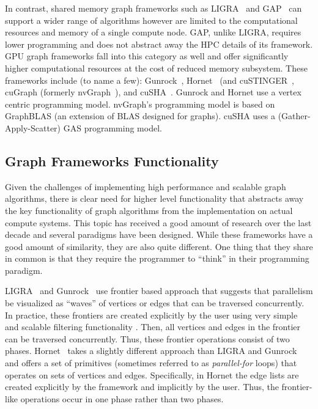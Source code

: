 In contrast, shared memory graph frameworks such as LIGRA~\cite{shun2013ligra} and  GAP~\cite{beamer2015gap} can support a wider range of algorithms however are limited to the computational resources and memory of a single compute node. GAP, unlike LIGRA, requires lower programming and does not abstract away the HPC details of its framework.
GPU graph frameworks fall into this category as well and offer significantly higher computational resources at the cost of reduced memory subsystem.
These frameworks include (to name a few): Gunrock~\cite{wang2017gunrock}, Hornet~\cite{green-hornet} (and cuSTINGER~\cite{DBLP:conf/hpec/GreenB16}, cuGraph (formerly nvGraph~\cite{nvGraph}), and cuSHA~\cite{cusha}.
Gunrock and Hornet use a vertex centric programming model. nvGraph's programming model is based on GraphBLAS (an extension of BLAS designed for graphs). cuSHA uses a (Gather-Apply-Scatter) GAS programming model.

\subsection{Graph Frameworks Functionality}

Given the challenges of implementing high performance and scalable graph algorithms, there is clear need for higher level functionality that abstracts away the key functionality of graph algorithms from the implementation on actual compute systems. This topic has received a good amount of research over the last decade and several paradigms have been designed. While these frameworks have a good amount of similarity, they are also quite different. One thing that they share in common is that they require the programmer to ``think'' in their programming paradigm.


LIGRA~\cite{shun2013ligra} and Gunrock~\cite{wang2017gunrock} use frontier based approach that suggests that parallelism be visualized as ``waves'' of vertices or edges that can be traversed concurrently. In practice, these frontiers are created explicitly by the user using very simple and scalable filtering functionality . Then, all vertices and edges in the frontier can be traversed concurrently. Thus, these frontier operations consist of two phases. Hornet~\cite{green-hornet} takes a slightly different approach than LIGRA and Gunrock and offers a set of primitives (sometimes referred to as \emph{parallel-for} loops) that operates on sets of vertices and edges. Specifically, in Hornet the edge lists are created explicitly by the framework and implicitly by the user. Thus, the frontier-like operations occur in one phase rather than two phases.

